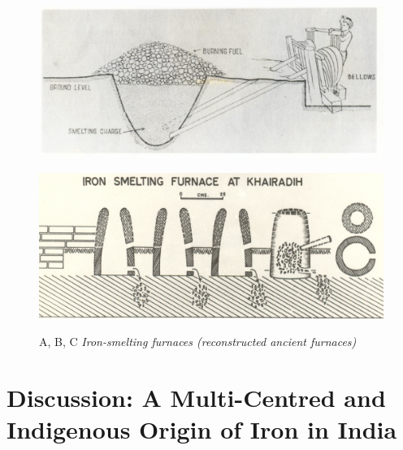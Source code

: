 \vspace{-.5cm}

\begin{figure}[H]
\includegraphics[scale=.85]{images/chapter-3/fig002b.jpg}\label{chapter-3-fig5b}
\end{figure}
\begin{figure}[H]
\setcounter{figure}{4}
\includegraphics[scale=.85]{images/chapter-3/fig002c.jpg}\label{chapter-3-fig5c}

\vspace{-.2cm}

\caption{A, B, C \textit{Iron-smelting furnaces (reconstructed ancient furnaces)}}\label{chapter-3-fig5abc}
\end{figure}


\section*{Discussion: A Multi-Centred and Indigenous Origin of Iron in India}\label{chapter3-section-5}

